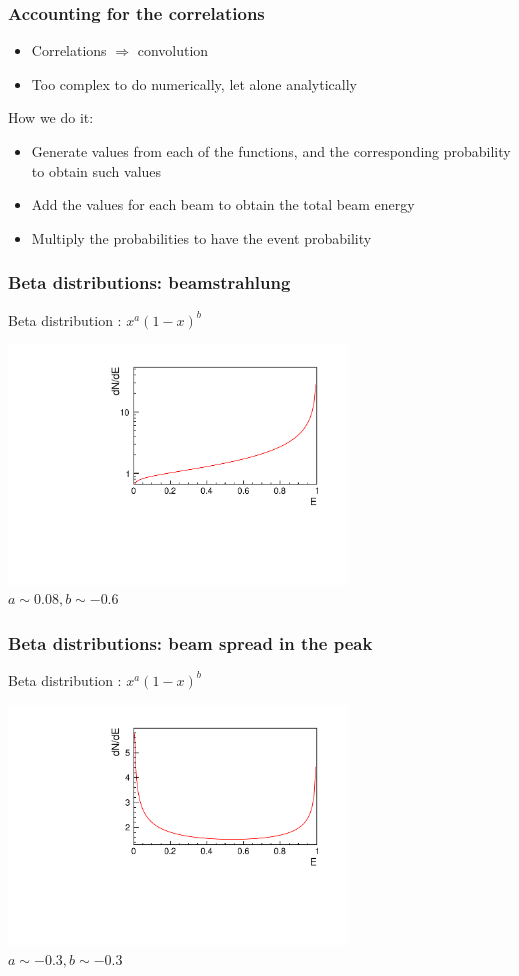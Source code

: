 \documentclass{beamer}
\begin{document}
\begin{frame}
\frametitle{Accounting for the correlations}
\begin{itemize}
  \item Correlations $\Rightarrow$ convolution
  \item Too complex to do numerically, let alone analytically
\end{itemize}
How we do it:
\begin{itemize}
  \item Generate values from each of the functions, and the
  corresponding probability to obtain such values
  \item Add the values for each beam to obtain the total beam energy
  \item Multiply the probabilities to have the event probability
\end{itemize}
\end{frame}

\begin{frame}
\frametitle{Beta distributions: beamstrahlung}\label{slide:betadiststra}
Beta distribution : $x^a(1-x)^b$ 
\begin{center}
\includegraphics[width=9cm]{BetaFunction_beamstrahlung.pdf}\\
$a\sim0.08, b\sim-0.6$
\end{center}
\end{frame}

\begin{frame}
\frametitle{Beta distributions: beam spread in the
peak}\label{slide:betadistspreadpeak} 
Beta distribution : $x^a(1-x)^b$ 
\begin{center}
\includegraphics[width=9cm]{BetaFunction_beamspreadpeak.pdf}\\
$a\sim-0.3, b\sim-0.3$
\end{center}
\end{frame}
\end{document}
